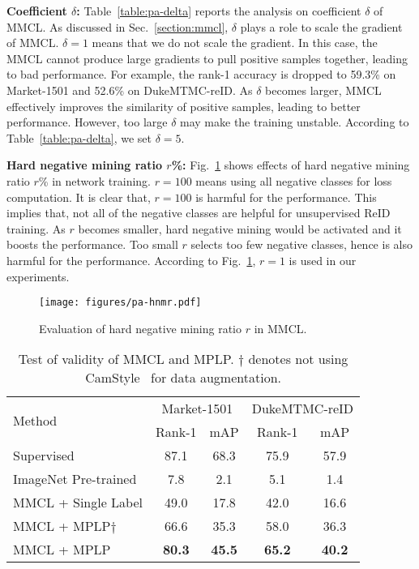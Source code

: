\documentclass[10pt,twocolumn,letterpaper]{article}
\begin{document}
\textbf{Coefficient $\delta$:} Table~\ref{table:pa-delta} reports the analysis on coefficient $\delta$ of MMCL. As discussed in Sec.~\ref{section:mmcl}, $\delta$ plays a role to scale the gradient of MMCL. $\delta=1$ means that we do not scale the gradient. In this case, the MMCL cannot produce large gradients to pull positive samples together, leading to bad performance. For example, the rank-1 accuracy is dropped to 59.3\% on Market-1501 and 52.6\% on DukeMTMC-reID. As $\delta$ becomes larger, MMCL effectively improves the similarity of positive samples, leading to better performance. However, too large $\delta$ may make the training unstable. According to Table~\ref{table:pa-delta}, we set $\delta=5$.

\textbf{Hard negative mining ratio $r$\%:} Fig.~\ref{figure:pa-hnmr} shows effects of hard negative mining ratio $r$\% in network training. $r=100$ means using all negative classes for loss computation. It is clear that, $r=100$ is harmful for the performance. This implies that, not all of the negative classes are helpful for unsupervised ReID training. As $r$ becomes smaller, hard negative mining would be activated and it boosts the performance. Too small $r$ selects too few negative classes, hence is also harmful for the performance. According to Fig.~\ref{figure:pa-hnmr}, $r=1$ is used in our experiments.

\begin{figure}
\begin{center}
\texttt{[image: figures/pa-hnmr.pdf]}
\end{center}
\vspace{-2mm}
\caption{Evaluation of hard negative mining ratio $r$ in MMCL.}
\label{figure:pa-hnmr}
\end{figure}

\begin{table}
\footnotesize
\begin{center}
\begin{tabular}{l||c|c||c|c}
\hline
\multirow{2}{*}{Method} & \multicolumn{2}{c||}{Market-1501} & \multicolumn{2}{c}{DukeMTMC-reID}\\
\cline{2-5}
 & Rank-1 & mAP & Rank-1 & mAP  \\
\hline\hline
Supervised & 87.1 & 68.3 & 75.9 & 57.9 \\
\hline
ImageNet Pre-trained & 7.8 & 2.1 & 5.1 & 1.4 \\
MMCL + Single Label  & 49.0 & 17.8 & 42.0 & 16.6\\
MMCL + MPLP$\dagger$ & {66.6} & {35.3} & {58.0} & {36.3} \\
MMCL + MPLP & \textbf{80.3} & \textbf{45.5} & \textbf{65.2} & \textbf{40.2} \\
\hline
\end{tabular}
\end{center}
\vspace{-2mm}
\caption{Test of validity of MMCL and MPLP. $\dagger$ denotes not using CamStyle~\cite{zhong2018camera} for data augmentation.}
\vspace{-2mm}
\label{table:ablation}
\end{table}
\end{document}
